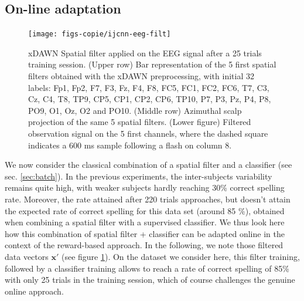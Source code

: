 \documentclass[conference]{IEEEtran}
\begin{document}

\subsection{On-line adaptation} \label{sec:sp_filt}

\begin{figure}
\centerline{
 \texttt{[image: figs-copie/ijcnn-eeg-filt]}
 }
\caption{xDAWN Spatial filter applied on the EEG signal after a 25 trials training session. 
(Upper row) Bar representation of the 5 first spatial filters obtained with the xDAWN preprocessing, with initial 32 labels: Fp1, Fp2, F7, F3, Fz, F4, F8, FC5, FC1, FC2, FC6, T7, C3, Cz, C4, T8, TP9, CP5, CP1, CP2, CP6, TP10, P7, P3, Pz, P4, P8, PO9, O1, Oz, O2 and PO10. 
(Middle row) Azimuthal scalp projection of the same 5 spatial filters.
(Lower figure) Filtered observation signal on the 5
first channels, where the dashed square indicates 
a 600 ms sample following a flash on column 8.   
}
\label{fig:filter}
\end{figure}

We now consider the classical combination of a spatial filter and a classifier (see sec. \ref{sec:batch}). %
In the previous experiments, the inter-subjects variability remains quite high, 
with weaker subjects hardly reaching 30\% correct spelling rate.
Moreover, the rate attained after 220 trials approaches, but doesn't attain the expected rate of correct spelling
for this data set (around 85 \%), obtained when combining a spatial filter with a
supervised classifier. 
We thus look here how this combination of spatial filter + classifier can be adapted
online in the context of the reward-based approach.
In the following, we note those 
filtered data vectors $\boldsymbol{x}'$ (see figure \ref{fig:filter}).
On the dataset we consider here, this filter training, followed by a classifier training 
allows to reach a rate of correct spelling of 85\% with only 25 trials in the 
training session, which of course challenges the genuine online approach.
\end{document}
